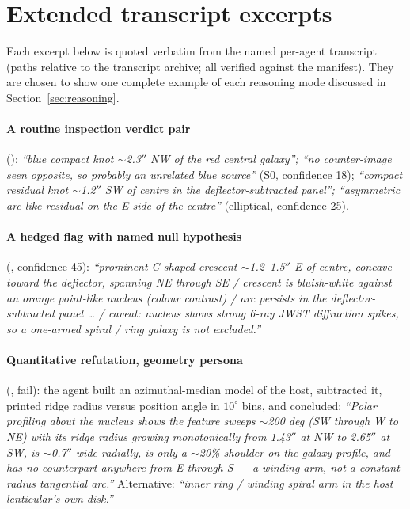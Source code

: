 \documentclass[11pt,letterpaper]{article}
\begin{document}
\section{Extended transcript excerpts}\label{app:excerpts}

Each excerpt below is quoted verbatim from the named per-agent transcript
(paths relative to the transcript archive; all verified against the
manifest). They are chosen to show one complete example of each reasoning
mode discussed in Section~\ref{sec:reasoning}.

\paragraph{A routine inspection verdict pair}
(): \emph{``blue compact knot
$\sim$2.3$''$ NW of the red central galaxy''; ``no counter-image seen
opposite, so probably an unrelated blue source''} (S0, confidence 18);
\emph{``compact residual knot $\sim$1.2$''$ SW of centre in the
deflector-subtracted panel''; ``asymmetric arc-like residual on the E side of
the centre''} (elliptical, confidence 25).

\paragraph{A hedged flag with named null hypothesis}
(, confidence 45):
\emph{``prominent C-shaped crescent $\sim$1.2--1.5$''$ E of centre, concave
toward the deflector, spanning NE through SE / crescent is bluish-white
against an orange point-like nucleus (colour contrast) / arc persists in the
deflector-subtracted panel \ldots{} / caveat: nucleus shows strong 6-ray JWST
diffraction spikes, so a one-armed spiral / ring galaxy is not excluded.''}

\paragraph{Quantitative refutation, geometry persona}
(, fail): the agent built an
azimuthal-median model of the host, subtracted it, printed ridge radius
versus position angle in $10^\circ$ bins, and concluded: \emph{``Polar
profiling about the nucleus shows the feature sweeps $\sim$200 deg (SW
through W to NE) with its ridge radius growing monotonically from 1.43$''$ at
NW to 2.65$''$ at SW, is $\sim$0.7$''$ wide radially, is only a $\sim$20\%
shoulder on the galaxy profile, and has no counterpart anywhere from E
through S --- a winding arm, not a constant-radius tangential arc.''}
Alternative: \emph{``inner ring / winding spiral arm in the host
lenticular's own disk.''}
\end{document}
